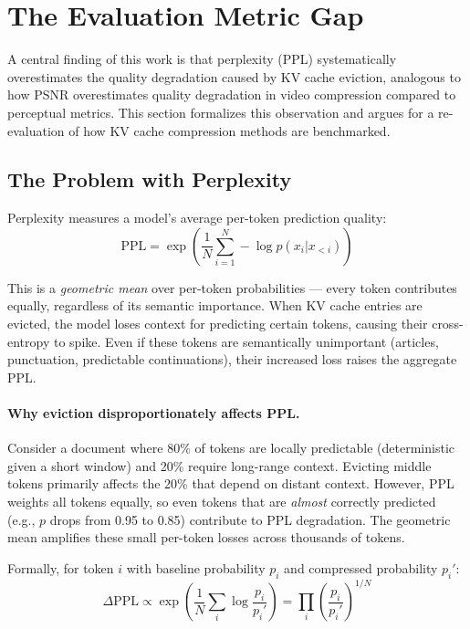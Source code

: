 \section{The Evaluation Metric Gap}
\label{sec:metric-gap}

A central finding of this work is that perplexity (PPL) systematically overestimates the quality degradation caused by KV cache eviction, analogous to how PSNR overestimates quality degradation in video compression compared to perceptual metrics. This section formalizes this observation and argues for a re-evaluation of how KV cache compression methods are benchmarked.

\subsection{The Problem with Perplexity}

Perplexity measures a model's average per-token prediction quality:
\begin{equation}
    \text{PPL} = \exp\left(\frac{1}{N}\sum_{i=1}^{N} -\log p(x_i | x_{<i})\right)
\end{equation}

This is a \emph{geometric mean} over per-token probabilities --- every token contributes equally, regardless of its semantic importance. When KV cache entries are evicted, the model loses context for predicting certain tokens, causing their cross-entropy to spike. Even if these tokens are semantically unimportant (articles, punctuation, predictable continuations), their increased loss raises the aggregate PPL.

\paragraph{Why eviction disproportionately affects PPL.}
Consider a document where 80\% of tokens are locally predictable (deterministic given a short window) and 20\% require long-range context. Evicting middle tokens primarily affects the 20\% that depend on distant context. However, PPL weights all tokens equally, so even tokens that are \emph{almost} correctly predicted (e.g., $p$ drops from 0.95 to 0.85) contribute to PPL degradation. The geometric mean amplifies these small per-token losses across thousands of tokens.

Formally, for token $i$ with baseline probability $p_i$ and compressed probability $p_i'$:
\begin{equation}
    \Delta\text{PPL} \propto \exp\left(\frac{1}{N}\sum_i \log\frac{p_i}{p_i'}\right) = \prod_i \left(\frac{p_i}{p_i'}\right)^{1/N}
\end{equation}

